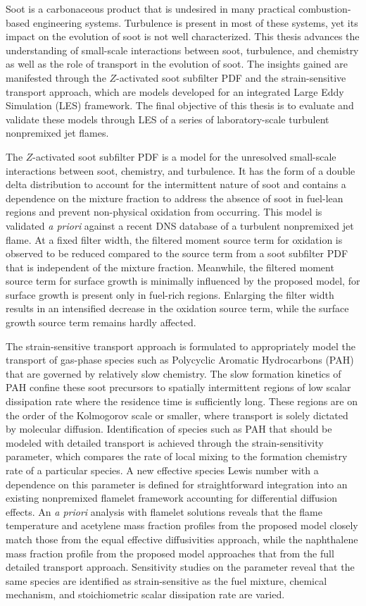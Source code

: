 Soot is a carbonaceous product that is undesired in many practical combustion-based engineering systems. Turbulence is present in most of these systems, yet its impact on the evolution of soot is not well characterized. This thesis advances the understanding of small-scale interactions between soot, turbulence, and chemistry as well as the role of transport in the evolution of soot. The insights gained are manifested through the $Z$-activated soot subfilter PDF and the strain-sensitive transport approach, which are models developed for an integrated Large Eddy Simulation (LES) framework. The final objective of this thesis is to evaluate and validate these models through LES of a series of laboratory-scale turbulent nonpremixed jet flames.

The $Z$-activated soot subfilter PDF is a model for the unresolved small-scale interactions between soot, chemistry, and turbulence. It has the form of a double delta distribution to account for the intermittent nature of soot and contains a dependence on the mixture fraction to address the absence of soot in fuel-lean regions and prevent non-physical oxidation from occurring. This model is validated \textit{a priori} against a recent DNS database of a turbulent nonpremixed jet flame. At a fixed filter width, the filtered moment source term for oxidation is observed to be reduced compared to the source term from a soot subfilter PDF that is independent of the mixture fraction. Meanwhile, the filtered moment source term for surface growth is minimally influenced by the proposed model, for surface growth is present only in fuel-rich regions. Enlarging the filter width results in an intensified decrease in the oxidation source term, while the surface growth source term remains hardly affected.

The strain-sensitive transport approach is formulated to appropriately model the transport of gas-phase species such as Polycyclic Aromatic Hydrocarbons (PAH) that are governed by relatively slow chemistry. The slow formation kinetics of PAH confine these soot precursors to spatially intermittent regions of low scalar dissipation rate where the residence time is sufficiently long. These regions are on the order of the Kolmogorov scale or smaller, where transport is solely dictated by molecular diffusion. Identification of species such as PAH that should be modeled with detailed transport is achieved through the strain-sensitivity parameter, which compares the rate of local mixing to the formation chemistry rate of a particular species. A new effective species Lewis number with a dependence on this parameter is defined for straightforward integration into an existing nonpremixed flamelet framework accounting for differential diffusion effects. An \textit{a priori} analysis with flamelet solutions reveals that the flame temperature and acetylene mass fraction profiles from the proposed model closely match those from the equal effective diffusivities approach, while the naphthalene mass fraction profile from the proposed model approaches that from the full detailed transport approach. Sensitivity studies on the parameter reveal that the same species are identified as strain-sensitive as the fuel mixture, chemical mechanism, and stoichiometric scalar dissipation rate are varied.

